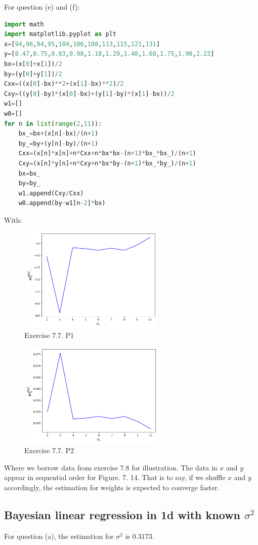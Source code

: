 \documentclass[UTF8]{ctexart}
\begin{document}
For question (e) and (f):
\begin{lstlisting}[language=python]
import math
import matplotlib.pyplot as plt
x=[94,96,94,95,104,106,108,113,115,121,131]
y=[0.47,0.75,0.83,0.98,1.18,1.29,1.40,1.60,1.75,1.90,2.23]
bx=(x[0]+x[1])/2
by=(y[0]+y[1])/2
Cxx=((x[0]-bx)**2+(x[1]-bx)**2)/2
Cxy=((y[0]-by)*(x[0]-bx)+(y[1]-by)*(x[1]-bx))/2
w1=[]
w0=[]
for n in list(range(2,11)):
    bx_=bx+(x[n]-bx)/(n+1)
    by_=by+(y[n]-by)/(n+1)
    Cxx=(x[n]*x[n]+n*Cxx+n*bx*bx-(n+1)*bx_*bx_)/(n+1)
    Cxy=(x[n]*y[n]+n*Cxy+n*bx*by-(n+1)*bx_*by_)/(n+1)
    bx=bx_
    by=by_
    w1.append(Cxy/Cxx)
    w0.append(by-w1[n-2]*bx)
\end{lstlisting}
With:
\begin{figure}[htbp]
\centering
\includegraphics[width=7cm,height=5cm]{./figures/7-7-1.png}
\caption{Exercise 7.7. P1}
\end{figure}
\begin{figure}[htbp]
\centering
\includegraphics[width=7cm,height=5cm]{./figures/7-7-2.png}
\caption{Exercise 7.7. P2}
\end{figure}
Where we borrow data from exercise 7.8 for illustration.
The data in $x$ and $y$ appear in sequential order for Figure. 7. 14.
That is to say, if we shuffle $x$ and $y$ accordingly, the estimation for weights is expected to converge faster.

\subsection{Bayesian linear regression in 1d with known $\sigma^{2}$}
For question (a), the estimation for $\sigma^{2}$ is $0.3173$.
\end{document}

